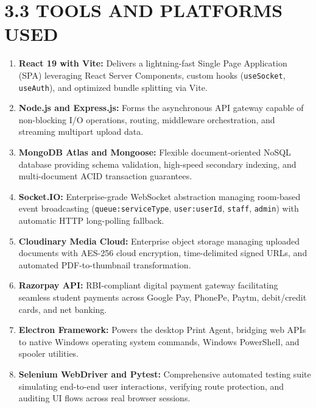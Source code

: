 \documentclass[12pt,a4paper,oneside]{report}
\begin{document}
\section{3.3 TOOLS AND PLATFORMS USED}
\begin{enumerate}[leftmargin=0.35in, itemsep=2pt]
  \item \textbf{React 19 with Vite:} Delivers a lightning-fast Single Page Application (SPA) leveraging React Server Components, custom hooks (\texttt{useSocket}, \texttt{useAuth}), and optimized bundle splitting via Vite.
  \item \textbf{Node.js and Express.js:} Forms the asynchronous API gateway capable of non-blocking I/O operations, routing, middleware orchestration, and streaming multipart upload data.
  \item \textbf{MongoDB Atlas and Mongoose:} Flexible document-oriented NoSQL database providing schema validation, high-speed secondary indexing, and multi-document ACID transaction guarantees.
  \item \textbf{Socket.IO:} Enterprise-grade WebSocket abstraction managing room-based event broadcasting (\texttt{queue:serviceType}, \texttt{user:userId}, \texttt{staff}, \texttt{admin}) with automatic HTTP long-polling fallback.
  \item \textbf{Cloudinary Media Cloud:} Enterprise object storage managing uploaded documents with AES-256 cloud encryption, time-delimited signed URLs, and automated PDF-to-thumbnail transformation.
  \item \textbf{Razorpay API:} RBI-compliant digital payment gateway facilitating seamless student payments across Google Pay, PhonePe, Paytm, debit/credit cards, and net banking.
  \item \textbf{Electron Framework:} Powers the desktop Print Agent, bridging web APIs to native Windows operating system commands, Windows PowerShell, and spooler utilities.
  \item \textbf{Selenium WebDriver and Pytest:} Comprehensive automated testing suite simulating end-to-end user interactions, verifying route protection, and auditing UI flows across real browser sessions.
\end{enumerate}
\end{document}
